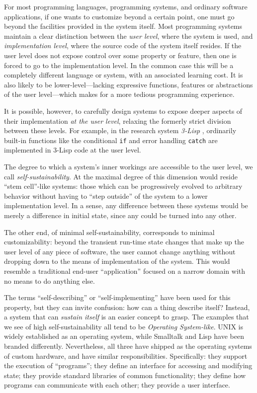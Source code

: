 For most programming languages, programming systems, and ordinary
software applications, if one wants to customize beyond a certain point,
one must go beyond the facilities provided in the system itself. Most
programming systems maintain a clear distinction between the \emph{user
level}, where the system is used, and \emph{implementation level}, where
the source code of the system itself resides. If the user level does not
expose control over some property or feature, then one is forced to go
to the implementation level. In the common case this will be a
completely different language or system, with an associated learning
cost. It is also likely to be lower-level---lacking expressive
functions, features or abstractions of the user level---which makes for
a more tedious programming experience.

It is possible, however, to carefully design systems to expose deeper
aspects of their implementation \emph{at the user level}, relaxing the
formerly strict division between these levels. For example, in the
research system \emph{3-Lisp} \cite{PRinPLs}, ordinarily built-in
functions like the conditional \texttt{if} and error handling
\texttt{catch} are implemented in 3-Lisp code at the user level.

The degree to which a system's inner workings are accessible to the user
level, we call \emph{self-sustainability}. At the maximal degree of this
dimension would reside ``stem cell''-like systems: those which can be
progressively evolved to arbitrary behavior without having to ``step
outside'' of the system to a lower implementation level. In a sense, any
difference between these systems would be merely a difference in initial
state, since any could be turned into any other.

The other end, of minimal self-sustainability, corresponds to minimal
customizability: beyond the transient run-time state changes that make
up the user level of any piece of software, the user cannot change
anything without dropping down to the means of implementation of the
system. This would resemble a traditional end-user ``application''
focused on a narrow domain with no means to do anything else.

The terms ``self-describing'' or ``self-implementing'' have been used
for this property, but they can invite confusion: how can a thing
describe itself? Instead, a system that can \emph{sustain itself} is an
easier concept to grasp. The examples that we see of high
self-sustainability all tend to be \emph{Operating System-like}. UNIX is
widely established as an operating system, while Smalltalk and Lisp have
been branded differently. Nevertheless, all three have shipped as the
operating systems of custom hardware, and have similar responsibilities.
Specifically: they support the execution of ``programs''; they define an
interface for accessing and modifying state; they provide standard
libraries of common functionality; they define how programs can
communicate with each other; they provide a user interface.

